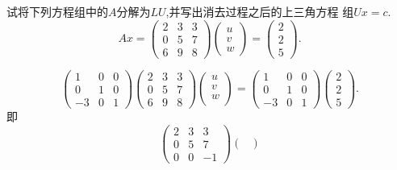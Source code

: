 ﻿\documentclass{book} \usepackage{exsheets} \usepackage{xeCJK}
\begin{document}
\begin{question}
  试将下列方程组中的$A$分解为$LU$,并写出消去过程之后的上三角方程
  组$Ux=c$.
$$
Ax=
\begin{pmatrix}
  2&3&3\\
  0&5&7\\
  6&9&8
\end{pmatrix}
\begin{pmatrix}
  u\\
  v\\
  w
\end{pmatrix}=
\begin{pmatrix}
  2\\
  2\\
  5
\end{pmatrix}.
$$
\end{question}
\begin{solution}
  \begin{equation}\label{eq:1.4.3.1}\tag{1}
    \begin{pmatrix}
      1&0&0\\
      0&1&0\\
      -3&0&1
    \end{pmatrix}
    \begin{pmatrix}
      2&3&3\\
      0&5&7\\
      6&9&8
    \end{pmatrix}
    \begin{pmatrix}
      u\\
      v\\
      w\\
    \end{pmatrix}=\begin{pmatrix}
      1&0&0\\
      0&1&0\\
      -3&0&1
    \end{pmatrix}
    \begin{pmatrix}
      2\\
      2\\
      5
    \end{pmatrix}.
  \end{equation}
  即
  \begin{equation}\label{eq:1.4.3.2}\tag{2}
    \begin{pmatrix}
      2&3&3\\
      0&5&7\\
      0&0&-1
    \end{pmatrix}
    \begin{pmatrix}

\end{pmatrix}
\end{equation}
\end{solution}
\end{document}
